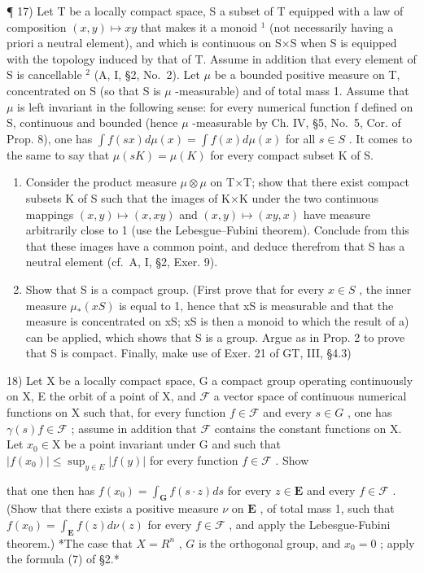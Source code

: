 ¶ 17) Let T be a locally compact space, S a subset of T equipped with a law of composition \((x,y)\mapsto xy\) that makes it a monoid \(^{1}\) (not necessarily having a priori a neutral element), and which is continuous on S×S when S is equipped with the topology induced by that of T. Assume in addition that every element of S is cancellable \(^{2}\) (A, I, §2, No.~2). Let \(\mu\) be a bounded positive measure on T, concentrated on S (so that S is \(\mu\) -measurable) and of total mass 1. Assume that \(\mu\) is left invariant in the following sense: for every numerical function f defined on S, continuous and bounded (hence \(\mu\) -measurable by Ch. IV, §5, No.~5, Cor. of Prop. 8), one has \(\int f(sx) d\mu(x) = \int f(x)d\mu(x)\) for all \(s \in S\) . It comes to the same to say that \(\mu(sK) = \mu(K)\) for every compact subset K of S.

\begin{enumerate}
\def\labelenumi{\alph{enumi})}
\item
  Consider the product measure \(\mu\otimes\mu\) on T×T; show that there exist compact subsets K of S such that the images of K×K under the two continuous mappings \((x,y)\mapsto(x,xy)\) and \((x,y)\mapsto(xy,x)\) have measure arbitrarily close to 1 (use the Lebesgue--Fubini theorem). Conclude from this that these images have a common point, and deduce therefrom that S has a neutral element (cf.~A, I, §2, Exer. 9).
\item
  Show that S is a compact group. (First prove that for every \(x \in S\) , the inner measure \(\mu_{*}(xS)\) is equal to 1, hence that xS is measurable and that the measure is concentrated on xS; xS is then a monoid to which the result of a) can be applied, which shows that S is a group. Argue as in Prop. 2 to prove that S is compact. Finally, make use of Exer. 21 of GT, III, §4.3)
\end{enumerate}

18) Let X be a locally compact space, G a compact group operating continuously on X, E the orbit of a point of X, and \(\mathcal {F}\) a vector space of continuous numerical functions on X such that, for every function \(f \in \mathcal {F}\) and every \(s \in G\) , one has \(\gamma (s) f \in \mathcal {F}\) ; assume in addition that \(\mathcal {F}\) contains the constant functions on X. Let \(x _ {0} \in \mathrm{X}\) be a point invariant under G and such that \(| f (x _ {0}) | \leqslant \sup _ {y \in E} | f (y) |\) for every function \(f \in \mathcal {F}\) . Show

that one then has \(f(x_0) = \int_{\mathbf{G}} f(s \cdot z) ds\) for every \(z \in \mathbf{E}\) and every \(f \in \mathcal{F}\) . (Show that there exists a positive measure \(\nu\) on \(\mathbf{E}\) , of total mass 1, such that \(f(x_0) = \int_{\mathbf{E}} f(z) d\nu(z)\) for every \(f \in \mathcal{F}\) , and apply the Lebesgue-Fubini theorem.) *The case that \(X = R^n\) , \(G\) is the orthogonal group, and \(x_0 = 0\) ; apply the formula (7) of §2.*

